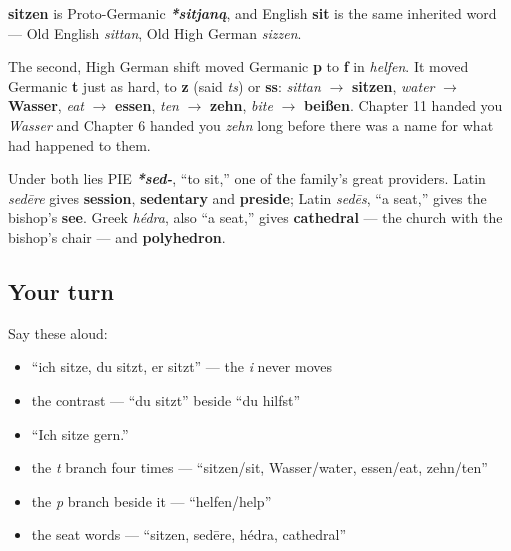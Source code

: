 \begin{cousinweb}
\textbf{sitzen} is Proto-Germanic \emph{\textbf{*sitjaną}}, and English \textbf{sit} is the same inherited word — Old English \emph{sittan}, Old High German \emph{sizzen}.

The second, High German shift moved Germanic \textbf{p} to \textbf{f} in \emph{helfen}. It moved Germanic \textbf{t} just as hard, to \textbf{z} (said \emph{ts}) or \textbf{ss}: \emph{sittan} $\to$ \textbf{sitzen}, \emph{water} $\to$ \textbf{Wasser}, \emph{eat} $\to$ \textbf{essen}, \emph{ten} $\to$ \textbf{zehn}, \emph{bite} $\to$ \textbf{beißen}. Chapter 11 handed you \emph{Wasser} and Chapter 6 handed you \emph{zehn} long before there was a name for what had happened to them.

Under both lies PIE \emph{\textbf{*sed-}}, \textquotedblleft{}to sit,\textquotedblright{} one of the family's great providers. Latin \emph{sedēre} gives \textbf{session}, \textbf{sedentary} and \textbf{preside}; Latin \emph{sedēs}, \textquotedblleft{}a seat,\textquotedblright{} gives the bishop's \textbf{see}. Greek \emph{hédra}, also \textquotedblleft{}a seat,\textquotedblright{} gives \textbf{cathedral} — the church with the bishop's chair — and \textbf{polyhedron}.
\end{cousinweb}

\subsection*{Your turn}
Say these aloud:

\begin{itemize}
\raggedright
  \item \textquotedblleft{}ich sitze, du sitzt, er sitzt\textquotedblright{} — the \emph{i} never moves
  \item the contrast — \textquotedblleft{}du sitzt\textquotedblright{} beside \textquotedblleft{}du hilfst\textquotedblright{}
  \item \textquotedblleft{}Ich sitze gern.\textquotedblright{}
  \item the \emph{t} branch four times — \textquotedblleft{}sitzen/sit, Wasser/water, essen/eat, zehn/ten\textquotedblright{}
  \item the \emph{p} branch beside it — \textquotedblleft{}helfen/help\textquotedblright{}
  \item the seat words — \textquotedblleft{}sitzen, sedēre, hédra, cathedral\textquotedblright{}
\end{itemize}

